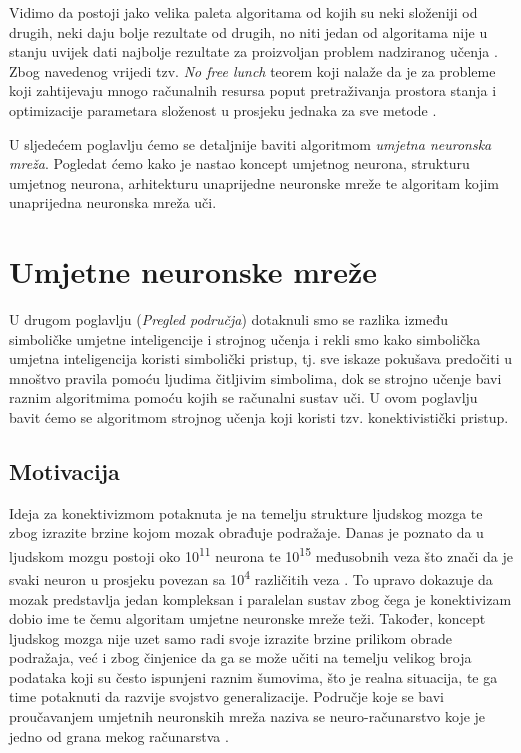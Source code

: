 \documentclass[times, utf8, zavrsni]{fer}
\begin{document}
\bigskip

Vidimo da postoji jako velika paleta algoritama od kojih su neki složeniji od drugih, neki daju bolje rezultate od drugih, no niti jedan od algoritama
nije u stanju uvijek dati najbolje rezultate za proizvoljan problem nadziranog učenja \citep{wiki:SUP}. Zbog navedenog vrijedi tzv. \textit{No free lunch} teorem koji nalaže da je za probleme koji zahtijevaju mnogo računalnih resursa poput pretraživanja prostora stanja i optimizacije parametara složenost u prosjeku jednaka za sve metode \citep{wiki:NFL}.

\bigskip
\bigskip

U sljedećem poglavlju ćemo se detaljnije baviti algoritmom \textit{umjetna neuronska mreža}. Pogledat ćemo kako je nastao koncept umjetnog neurona, strukturu umjetnog neurona, arhitekturu unaprijedne neuronske mreže te algoritam kojim unaprijedna neuronska mreža uči.

\chapter{Umjetne neuronske mreže}
U drugom poglavlju (\textit{Pregled područja}) dotaknuli smo se razlika između simboličke umjetne inteligencije i strojnog učenja i rekli smo kako simbolička umjetna inteligencija koristi simbolički pristup, tj. sve iskaze pokušava predočiti u mnoštvo pravila pomoću ljudima čitljivim simbolima, dok se strojno učenje bavi raznim algoritmima pomoću kojih se računalni sustav uči. U ovom poglavlju bavit ćemo se algoritmom strojnog učenja koji koristi tzv. konektivistički pristup.

\section{Motivacija}
Ideja za konektivizmom  potaknuta je na temelju strukture ljudskog mozga te zbog izrazite brzine kojom mozak obrađuje podražaje. Danas je poznato da u ljudskom mozgu postoji oko 10\textsuperscript{11} neurona te 10\textsuperscript{15} međusobnih veza što znači da je svaki neuron u prosjeku povezan sa 10\textsuperscript{4} različitih veza \citep{cupicNENR}. To upravo dokazuje da mozak predstavlja jedan kompleksan i paralelan sustav zbog čega je konektivizam dobio ime te čemu algoritam umjetne neuronske mreže teži. Također, koncept ljudskog mozga nije uzet samo radi svoje izrazite brzine prilikom obrade podražaja, već i zbog činjenice da ga se može učiti na temelju velikog broja podataka koji su često ispunjeni raznim šumovima, što je realna situacija, te ga time potaknuti da razvije svojstvo generalizacije. Područje koje se bavi proučavanjem umjetnih neuronskih mreža naziva se neuro-računarstvo  koje je jedno od grana mekog računarstva .
\end{document}
